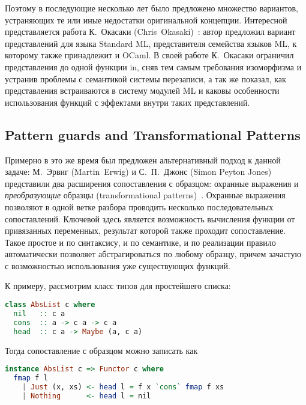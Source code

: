 Поэтому в последующие несколько лет было предложено множество вариантов, устраняющих те или иные недостатки оригинальной концепции. Интересной представляется работа К.~Окасаки (Chris~Okasaki)~\cite{okasaki98views}: автор предложил вариант представлений для языка Standard ML, представителя семейства языков ML, к которому также принадлежит и OCaml. В своей работе К.~Окасаки ограничил представления до одной функции in, сняв тем самым требования изоморфизма и устранив проблемы с семантикой системы перезаписи, а так же показал, как представления встраиваются в систему модулей ML и каковы особенности использования функций с эффектами внутри таких представлений.

\subsection{Pattern guards and Transformational Patterns} \label{sec:pattern_guards}
Примерно в это же время был предложен альтернативный подход к данной задаче: М.~Эрвиг (Martin~Erwig) и С.~П.~Джонс (Simon Peyton Jones) представили два расширения сопоставления с образцом: охранные выражения и \textit{преобразующие} образцы (transformational patterns)~\cite{erwig2000pattern}. Охранные выражения позволяют в одной ветке разбора проводить нес\-колько последовательных сопоставлений. Ключевой здесь является возможность вычисления функции от привязанных переменных, результат которой также проходит сопоставление.  Такое простое и по синтаксису, и по семантике, и по реализации правило автоматически позволяет абстрагироваться по любому образцу, причем зачастую с возможностью использования уже существующих функций. 

К примеру, рассмотрим класс типов для простейшего списка:

\noindent
\begin{minipage}{\linewidth}
\begin{lstlisting}[language=haskell]
class AbsList c where
  nil   :: c a
  cons  :: a -> c a -> c a
  head  :: c a -> Maybe (a, c a)
\end{lstlisting}
\end{minipage}

Тогда сопоставление с образцом можно записать как

\noindent
\begin{minipage}{\linewidth}
\begin{lstlisting}[language=haskell]
instance AbsList c => Functor c where
  fmap f l 
    | Just (x, xs) <- head l = f x `cons` fmap f xs
    | Nothing      <- head l = nil
\end{lstlisting}
\end{minipage}

